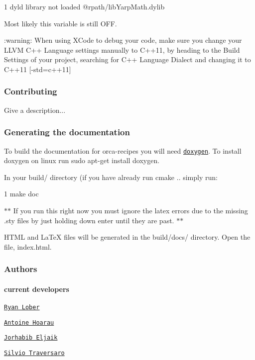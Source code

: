 \begin{DoxyCode}
1 dyld library not loaded @rpath/libYarpMath.dylib
\end{DoxyCode}


Most likely this variable is still {\ttfamily O\+FF}.

\+:warning\+: When using X\+Code to debug your code, make sure you change your L\+L\+VM C++ Language settings manually to C++11, by heading to the {\ttfamily Build Settings} of your project, searching for {\ttfamily C++ Language Dialect} and changing it to {\ttfamily C++11 \mbox{[}-\/std=c++11\mbox{]}}

\subsubsection*{Contributing}

Give a description...

\subsubsection*{Generating the documentation}

To build the documentation for {\ttfamily orca-\/recipes} you will need \href{http://www.stack.nl/~dimitri/doxygen/index.html}{\tt {\ttfamily doxygen}}. To install {\ttfamily doxygen} on linux run {\ttfamily sudo apt-\/get install doxygen}.

In your {\ttfamily build/} directory (if you have already run {\ttfamily cmake ..} simply run\+: 
\begin{DoxyCode}
1 make doc
\end{DoxyCode}
 $\ast$$\ast$ If you run this right now you must ignore the latex errors due to the missing {\ttfamily .sty} files by just holding down {\ttfamily enter} until they are past. $\ast$$\ast$

H\+T\+ML and La\+TeX files will be generated in the {\ttfamily build/docs/} directory. Open the file, {\ttfamily index.\+html}.

\subsubsection*{Authors}

\paragraph*{current developers}


\begin{DoxyItemize}
\item \href{https://github.com/rlober}{\tt Ryan Lober}
\item \href{https://github.com/ahoarau}{\tt Antoine Hoarau}
\item \href{https://github.com/jeljaik}{\tt Jorhabib Eljaik}
\item \href{https://github.com/traversaro}{\tt Silvio Traversaro}
\end{DoxyItemize}

